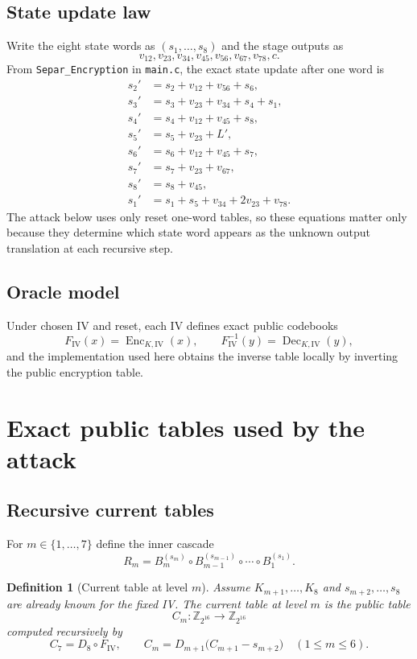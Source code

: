 \documentclass[11pt]{article}
\newtheorem{definition}{Definition}
\newcommand{\Z}[1]{\mathbb{Z}_{#1}}
\begin{document}
\subsection{State update law}
Write the eight state words as $(s_1,\dots,s_8)$ and the stage outputs as
\[
v_{12},v_{23},v_{34},v_{45},v_{56},v_{67},v_{78},c.
\]
From \texttt{Separ\_Encryption} in \texttt{main.c}, the exact state update after one word is
\begin{align}
s_2' &= s_2 + v_{12} + v_{56} + s_6, \label{eq:s2}\\
s_3' &= s_3 + v_{23} + v_{34} + s_4 + s_1, \label{eq:s3}\\
s_4' &= s_4 + v_{12} + v_{45} + s_8, \label{eq:s4}\\
s_5' &= s_5 + v_{23} + L', \label{eq:s5}\\
s_6' &= s_6 + v_{12} + v_{45} + s_7, \label{eq:s6}\\
s_7' &= s_7 + v_{23} + v_{67}, \label{eq:s7}\\
s_8' &= s_8 + v_{45}, \label{eq:s8}\\
s_1' &= s_1 + s_5 + v_{34} + 2v_{23} + v_{78}. \label{eq:s1}
\end{align}
The attack below uses only reset one-word tables, so these equations matter only because they determine which state word appears as the unknown output translation at each recursive step.

\subsection{Oracle model}
Under chosen IV and reset, each IV defines exact public codebooks
\[
F_{\mathrm{IV}}(x)=\operatorname{Enc}_{K,\mathrm{IV}}(x),
\qquad
F_{\mathrm{IV}}^{-1}(y)=\operatorname{Dec}_{K,\mathrm{IV}}(y),
\]
and the implementation used here obtains the inverse table locally by inverting the public encryption table.

\section{Exact public tables used by the attack}
\subsection{Recursive current tables}
For $m\in\{1,\dots,7\}$ define the inner cascade
\[
R_m
=
B_m^{(s_m)}
\circ B_{m-1}^{(s_{m-1})}
\circ \cdots \circ
B_1^{(s_1)}.
\]

\begin{definition}[Current table at level $m$]
Assume $K_{m+1},\dots,K_8$ and $s_{m+2},\dots,s_8$ are already known for the fixed IV. The \emph{current table} at level $m$ is the public table
\[
C_m:\Z{2^{16}}\to\Z{2^{16}}
\]
computed recursively by
\[
C_7=D_8\circ F_{\mathrm{IV}},
\qquad
C_m=D_{m+1}\bigl(C_{m+1}-s_{m+2}\bigr)
\quad (1\le m\le 6).
\]
\end{definition}
\end{document}
